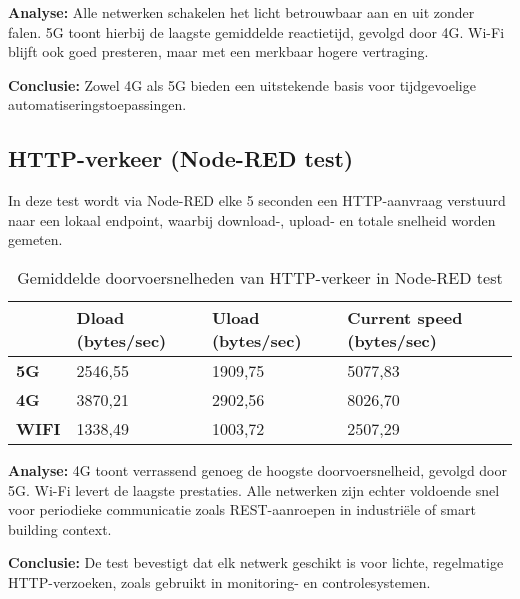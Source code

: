 \textbf{Analyse:} Alle netwerken schakelen het licht betrouwbaar aan en uit zonder falen. 5G toont hierbij de laagste gemiddelde reactietijd, gevolgd door 4G. Wi-Fi blijft ook goed presteren, maar met een merkbaar hogere vertraging.

\textbf{Conclusie:} Zowel 4G als 5G bieden een uitstekende basis voor tijdgevoelige automatiseringstoepassingen.

\subsection{HTTP-verkeer (Node-RED test)}

In deze test wordt via Node-RED elke 5 seconden een HTTP-aanvraag verstuurd naar een lokaal endpoint, waarbij download-, upload- en totale snelheid worden gemeten.

\begin{table}[h]
    \centering
    \begin{tabular}{l|l|l|l|}
        \cline{2-4}
        & \textbf{Dload (bytes/sec)} & \textbf{Uload (bytes/sec)} & \textbf{Current speed (bytes/sec)} \\ \hline
        \multicolumn{1}{|l|}{\textbf{5G}} & 2546,55                     & 1909,75                    & 5077,83                             \\ \hline
        \multicolumn{1}{|l|}{\textbf{4G}} & 3870,21                     & 2902,56                    & 8026,70                             \\ \hline
        \multicolumn{1}{|l|}{\textbf{WIFI}}       & 1338,49                     & 1003,72                    & 2507,29                             \\ \hline
    \end{tabular}
    \caption{Gemiddelde doorvoersnelheden van HTTP-verkeer in Node-RED test}
\end{table}

\textbf{Analyse:} 4G toont verrassend genoeg de hoogste doorvoersnelheid, gevolgd door 5G. Wi-Fi levert de laagste prestaties. Alle netwerken zijn echter voldoende snel voor periodieke communicatie zoals REST-aanroepen in industriële of smart building context.

\textbf{Conclusie:} De test bevestigt dat elk netwerk geschikt is voor lichte, regelmatige HTTP-verzoeken, zoals gebruikt in monitoring- en controlesystemen.






